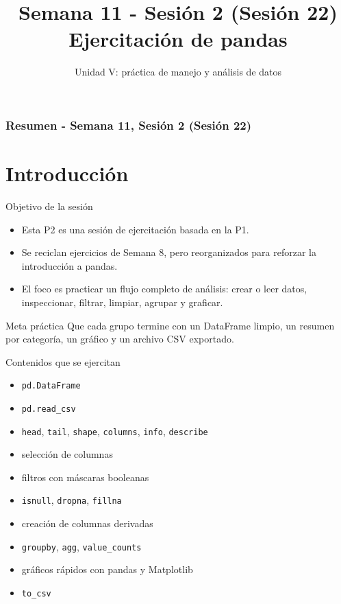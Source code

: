 \documentclass[10pt]{beamer}
\title[Semana 11 - P2]{Semana 11 - Sesión 2 (Sesión 22)\\Ejercitación de pandas}
\subtitle{Unidad V: práctica de manejo y análisis de datos}
\begin{document}
\myfront{}

\begin{frame}
  \titlepage
\end{frame}

\begin{frame}
  \frametitle{Resumen - Semana 11, Sesión 2 (Sesión 22)}
  \tableofcontents
\end{frame}


\section{Introducción}

\begin{frame}{Objetivo de la sesión}
  \begin{itemize}
    \item Esta P2 es una sesión de ejercitación basada en la P1.
    \item Se reciclan ejercicios de Semana 8, pero reorganizados para reforzar la introducción a pandas.
    \item El foco es practicar un flujo completo de análisis:
      crear o leer datos, inspeccionar, filtrar, limpiar, agrupar y graficar.
  \end{itemize}
  \begin{alertblock}{Meta práctica}
    Que cada grupo termine con un DataFrame limpio, un resumen por categoría, un gráfico y un archivo CSV exportado.
  \end{alertblock}
\end{frame}

\begin{frame}{Contenidos que se ejercitan}
  \begin{itemize}
    \item \texttt{pd.DataFrame}
    \item \texttt{pd.read\_csv}
    \item \texttt{head}, \texttt{tail}, \texttt{shape}, \texttt{columns}, \texttt{info}, \texttt{describe}
    \item selección de columnas
    \item filtros con máscaras booleanas
    \item \texttt{isnull}, \texttt{dropna}, \texttt{fillna}
    \item creación de columnas derivadas
    \item \texttt{groupby}, \texttt{agg}, \texttt{value\_counts}
    \item gráficos rápidos con pandas y Matplotlib
    \item \texttt{to\_csv}
  \end{itemize}
\end{frame}
\end{document}
